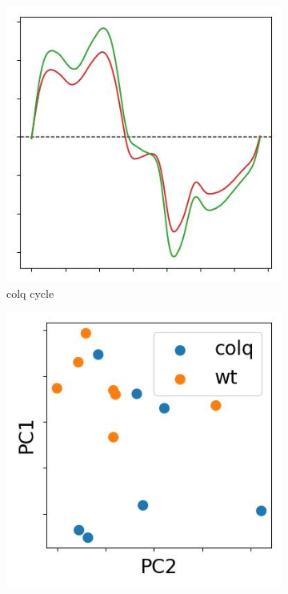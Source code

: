 \begin{figure}
  \centering
  \begin{subfigure}[b]{0.16\textwidth}
    \centering
    \includegraphics[width = \textwidth]{pictures/exp_1_cycle_example.jpeg}
    \caption{colq cycle}
    \label{fig:colq-cycle}
  \end{subfigure}
  \begin{subfigure}[b]{0.16\textwidth}
    \centering
    \includegraphics[width = \textwidth]{pictures/exp_1_scatter.jpeg}

\end{subfigure}
\end{figure}
